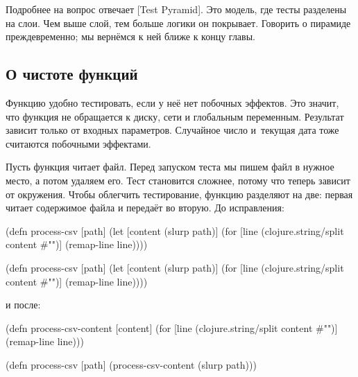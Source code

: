 
Подробнее на вопрос отвечает [Test Pyramid].
Это модель, где тесты разделены на слои. Чем выше слой, тем больше логики он
покрывает. Говорить о пирамиде преждевременно; мы вернёмся к ней ближе к концу
главы.

\subsection{О чистоте функций}


Функцию удобно тестировать, если у неё нет побочных эффектов. Это значит, что
функция не обращается к диску, сети и глобальным переменным. Результат зависит
только от входных параметров. Случайное число и~текущая дата тоже считаются
побочными эффектами.

Пусть функция читает файл. Перед запуском теста мы пишем файл в нужное место, а
потом удаляем его. Тест становится сложнее, потому что теперь зависит от
окружения. Чтобы облегчить тестирование, функцию разделяют на две: первая читает
содержимое файла и передаёт во вторую. До исправления:


\ifx\devicetype\mobile

\begin{english}
  \begin{clojure}
(defn process-csv [path]
  (let [content (slurp path)]
    (for [line (clojure.string/split
                 content #"\n")]
      (remap-line line))))
  \end{clojure}
\end{english}

\else

\begin{english}
  \begin{clojure}
(defn process-csv [path]
  (let [content (slurp path)]
    (for [line (clojure.string/split content #"\n")]
      (remap-line line))))
  \end{clojure}
\end{english}

\fi

\noindent
и после:

\ifx\devicetype\mobile

\begin{english}
  \begin{clojure}
(defn process-csv-content [content]
  (for [line (clojure.string/split
               content #"\n")]
    (remap-line line)))

(defn process-csv [path]
  (process-csv-content (slurp path)))
  \end{clojure}
\end{english}

